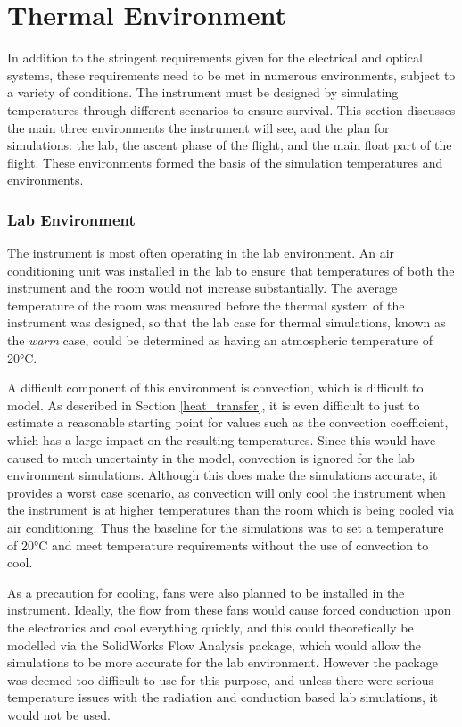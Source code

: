 \section{Thermal Environment}\label{thermal_env_ch3_sec}
In addition to the stringent requirements given for the electrical and optical systems, these requirements need to be met in numerous environments, subject to a variety of conditions. The instrument must be designed by simulating temperatures through different scenarios to ensure survival. This section discusses the main three environments the instrument will see, and the plan for simulations: the lab, the ascent phase of the flight, and the main float part of the flight. These environments formed the basis of the simulation temperatures and environments. 

\subsubsection{Lab Environment}
The instrument is most often operating in the lab environment. An air conditioning unit was installed in the lab to ensure that temperatures of both the instrument and the room would not increase substantially. The average temperature of the room was measured before the thermal system of the instrument was designed, so that the lab case for thermal simulations, known as the \textit{warm} case, could be determined as having an atmospheric temperature of 20°C.

A difficult component of this environment is convection, which is difficult to model. As described in Section \ref{heat_transfer}, it is even difficult to just to estimate a reasonable starting point for values such as the convection coefficient, which has a large impact on the resulting temperatures. Since this would have caused to much uncertainty in the model, convection is ignored for the lab environment simulations. Although this does make the simulations accurate, it provides a worst case scenario, as convection will only cool the instrument when the instrument is at higher temperatures than the room which is being cooled via air conditioning. Thus the baseline for the simulations was to set a temperature of 20°C and meet temperature requirements without the use of convection to cool. 

As a precaution for cooling, fans were also planned to be installed in the instrument. Ideally, the flow from these fans would cause forced conduction upon the electronics and cool everything quickly, and this could theoretically be modelled via the SolidWorks Flow Analysis package, which would allow the simulations to be more accurate for the lab environment. However the package was deemed too difficult to use for this purpose, and unless there were serious temperature issues with the radiation and conduction based lab simulations, it would not be used.

